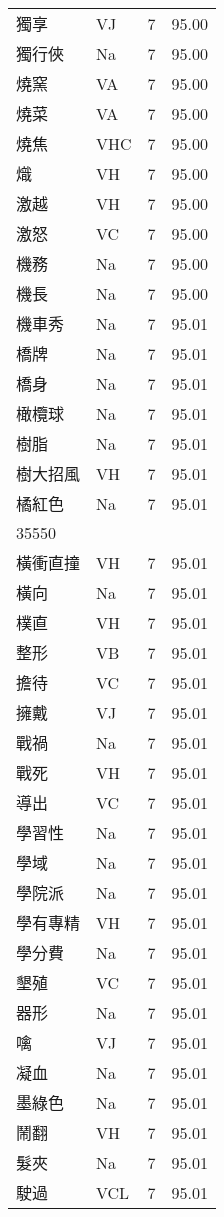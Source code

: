\documentclass[twocolumn]{book}
\begin{document}
\begin{supertabular}{llrr}
獨享 & VJ & 7 &  95.00\\
獨行俠 & Na & 7 &  95.00\\
燒窯 & VA & 7 &  95.00\\
燒菜 & VA & 7 &  95.00\\
燒焦 & VHC & 7 &  95.00\\
熾 & VH & 7 &  95.00\\
激越 & VH & 7 &  95.00\\
激怒 & VC & 7 &  95.00\\
機務 & Na & 7 &  95.00\\
機長 & Na & 7 &  95.00\\
機車秀 & Na & 7 &  95.01\\
橋牌 & Na & 7 &  95.01\\
橋身 & Na & 7 &  95.01\\
橄欖球 & Na & 7 &  95.01\\
樹脂 & Na & 7 &  95.01\\
樹大招風 & VH & 7 &  95.01\\
橘紅色 & Na & 7 &  95.01\\
35550\\
橫衝直撞 & VH & 7 &  95.01\\
橫向 & Na & 7 &  95.01\\
樸直 & VH & 7 &  95.01\\
整形 & VB & 7 &  95.01\\
擔待 & VC & 7 &  95.01\\
擁戴 & VJ & 7 &  95.01\\
戰禍 & Na & 7 &  95.01\\
戰死 & VH & 7 &  95.01\\
導出 & VC & 7 &  95.01\\
學習性 & Na & 7 &  95.01\\
學域 & Na & 7 &  95.01\\
學院派 & Na & 7 &  95.01\\
學有專精 & VH & 7 &  95.01\\
學分費 & Na & 7 &  95.01\\
墾殖 & VC & 7 &  95.01\\
器形 & Na & 7 &  95.01\\
噙 & VJ & 7 &  95.01\\
凝血 & Na & 7 &  95.01\\
墨綠色 & Na & 7 &  95.01\\
鬧翻 & VH & 7 &  95.01\\
髮夾 & Na & 7 &  95.01\\
駛過 & VCL & 7 &  95.01\\

\end{supertabular}
\end{document}
